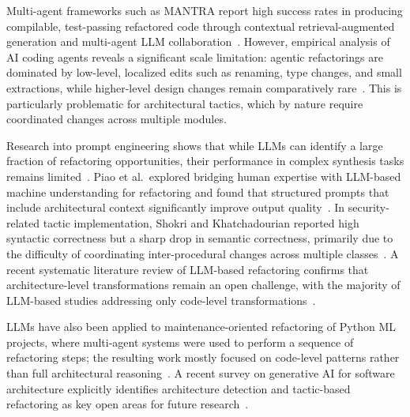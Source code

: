 Multi-agent frameworks such as MANTRA report high success rates in producing compilable, test-passing refactored code through contextual retrieval-augmented generation and multi-agent LLM collaboration~\cite{xu2025mantra}. However, empirical analysis of AI coding agents reveals a significant scale limitation: agentic refactorings are dominated by low-level, localized edits such as renaming, type changes, and small extractions, while higher-level design changes remain comparatively rare~\cite{horikawa2025agentic}. This is particularly problematic for architectural tactics, which by nature require coordinated changes across multiple modules.

Research into prompt engineering shows that while LLMs can identify a large fraction of refactoring opportunities, their performance in complex synthesis tasks remains limited~\cite{liu2025exploring}. Piao et al.\ explored bridging human expertise with LLM-based machine understanding for refactoring and found that structured prompts that include architectural context significantly improve output quality~\cite{piao2025refactoring}. In security-related tactic implementation, Shokri and Khatchadourian reported high syntactic correctness but a sharp drop in semantic correctness, primarily due to the difficulty of coordinating inter-procedural changes across multiple classes~\cite{shokri2024ipsynth}. A recent systematic literature review of LLM-based refactoring confirms that architecture-level transformations remain an open challenge, with the majority of LLM-based studies addressing only code-level transformations~\cite{martinez2025refactoring}.

LLMs have also been applied to maintenance-oriented refactoring of Python ML projects, where multi-agent systems were used to perform a sequence of refactoring steps; the resulting work mostly focused on code-level patterns rather than full architectural reasoning~\cite{pucho2025refactoring}. A recent survey on generative AI for software architecture explicitly identifies architecture detection and tactic-based refactoring as key open areas for future research~\cite{esposito2025generative}.